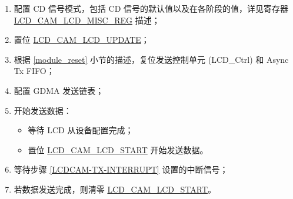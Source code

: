\documentclass[main\_\_CN.tex]{subfiles}
\begin{document}
\begin{enumerate}
\begin{itemize}
\begin{tiplisting}
\vspace{-2em}
\begin{enumerate}
    \item \label{note-1} 定长输出模式是指：LCD 发送完成 \hyperref[fielddesc:LCDCAMLCDDOUTCYCLELEN]{LCD\_CAM\_LCD\_DOUT\_CYCLELEN} 中配置的数据长度即结束 LCD 发送。
    \item \label{note-2} 持续输出模式是指：LCD 持续发送数据，直到
    \begin{enumerate}
        \item \hyperref[fielddesc:LCDCAMLCDSTART]{LCD\_CAM\_LCD\_START} 被清零；
        \item \hyperref[fielddesc:LCDCAMLCDRESET]{LCD\_CAM\_LCD\_RESET} 被置位；
        \item GDMA 中所有数据被发送完。
    \end{enumerate}
\end{enumerate}
\end{tiplisting}
\end{itemize}
    \item 配置 CD 信号模式，包括 CD 信号的默认值以及在各阶段的值，详见寄存器 \hyperref[regdesc:LCDCAMLCDMISCREG]{LCD\_CAM\_LCD\_MISC\_REG} 描述；

    \item 置位 \hyperref[fielddesc:LCDCAMLCDUPDATE]{LCD\_CAM\_LCD\_UPDATE}；

    \item 根据 \ref{module_reset} 小节的描述，复位发送控制单元 (LCD\_Ctrl) 和 Async Tx FIFO；

    \item 配置 GDMA 发送链表；

    \item 开始发送数据：
    \begin{itemize}
        \item 等待 LCD 从设备配置完成；
        \item 置位 \hyperref[fielddesc:LCDCAMLCDSTART]{LCD\_CAM\_LCD\_START} 开始发送数据。
    \end{itemize}

    \item 等待步骤 \ref{LCDCAM-TX-INTERRUPT} 设置的中断信号；

    \item 若数据发送完成，则清零 \hyperref[fielddesc:LCDCAMLCDSTART]{LCD\_CAM\_LCD\_START}。
\end{enumerate}
\end{document}
